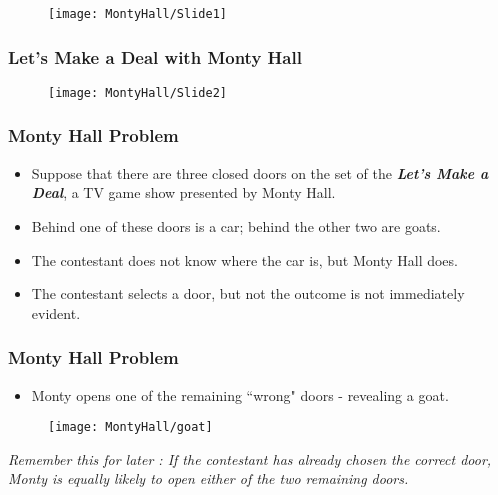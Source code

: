 \documentclass{beamer}
\begin{document}
\begin{frame}
\begin{figure}
\centering
\texttt{[image: MontyHall/Slide1]}


\end{figure}

\end{frame}
\begin{frame}
	\frametitle{Let's Make a Deal with Monty Hall}
	\begin{figure}
		\centering
		\texttt{[image: MontyHall/Slide2]}
		
	\end{figure}
	
\end{frame}
\begin{frame}
	
	\frametitle{Monty Hall Problem}\LARGE
	\begin{itemize}
	\item Suppose that there are three closed doors on the set of the  \textbf{\emph{Let's Make a Deal}}, a TV game show presented by Monty Hall. 
	\item Behind one of these doors is a car; behind the other two are goats. 
	\item The contestant does not know where the car is, but Monty Hall does.
	
	\item 
	The contestant selects a door, but not the outcome is not immediately evident. 
	\end{itemize}
	
\end{frame}
\begin{frame}
	
	\frametitle{Monty Hall Problem}\LARGE
	\begin{itemize}
	\item Monty opens one of the remaining ``wrong" doors - revealing a goat.
\end{itemize}

\begin{figure}
\centering
\texttt{[image: MontyHall/goat]}
\caption{}
\label{fig:goat}
\end{figure}

	{ \Large \textit{Remember this for later : If the contestant has already chosen the correct door, Monty is equally likely to open either of the two remaining doors.}
}
\end{frame}
\end{document}
